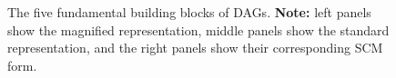 \documentclass[
  authoryear,
  preprint,
  1p]{elsarticle}
\begin{document}
\begin{figure}
\begin{minipage}{0.33\linewidth}


\end{minipage}%
%
\begin{minipage}{0.33\linewidth}

\centering{

\[
\begin{aligned}
  X & := f_{X}(e_{X}) \\
  Z & := f_{Z}(X,Y,e_{Z}) \\
  Y & := f_{Y}(e_{Y}) \\
  e_{X} & \perp\!\!\!\perp e_{Y} \\
  e_{X} & \perp\!\!\!\perp e_{Z} \\
  e_{Z} & \perp\!\!\!\perp e_{Y}
\end{aligned}
\]

}


\end{minipage}%

\caption{\label{fig-dags_scms}The five fundamental building blocks of
DAGs. \textbf{Note:} left panels show the magnified representation,
middle panels show the standard representation, and the right panels
show their corresponding SCM form.}

\end{figure}%
\end{document}
